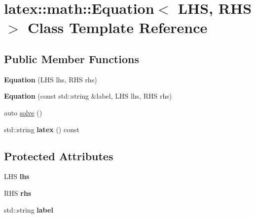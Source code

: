 \hypertarget{classlatex_1_1math_1_1Equation}{\section{latex\-:\-:math\-:\-:\-Equation$<$ \-L\-H\-S, \-R\-H\-S $>$ \-Class \-Template \-Reference}
\label{classlatex_1_1math_1_1Equation}
}
\subsection*{\-Public \-Member \-Functions}
\begin{DoxyCompactItemize}
\item 
\hypertarget{classlatex_1_1math_1_1Equation_abf2df112f6302c99b56fa31927142d33}{{\bfseries \-Equation} (\-L\-H\-S lhs, \-R\-H\-S rhs)}\label{classlatex_1_1math_1_1Equation_abf2df112f6302c99b56fa31927142d33}

\item 
\hypertarget{classlatex_1_1math_1_1Equation_a354a3d509dd259c1c0b51ab915867169}{{\bfseries \-Equation} (const std\-::string \&label, \-L\-H\-S lhs, \-R\-H\-S rhs)}\label{classlatex_1_1math_1_1Equation_a354a3d509dd259c1c0b51ab915867169}

\item 
auto \hyperlink{classlatex_1_1math_1_1Equation_a07edd6119b4c578f0bd109501284120b}{solve} ()
\item 
\hypertarget{classlatex_1_1math_1_1Equation_acc052b3d3d93f32438ada7338b641d6e}{std\-::string {\bfseries latex} () const }\label{classlatex_1_1math_1_1Equation_acc052b3d3d93f32438ada7338b641d6e}

\end{DoxyCompactItemize}
\subsection*{\-Protected \-Attributes}
\begin{DoxyCompactItemize}
\item 
\hypertarget{classlatex_1_1math_1_1Equation_a8e2395207a86cc6fda70df7e31ca004f}{\-L\-H\-S {\bfseries lhs}}\label{classlatex_1_1math_1_1Equation_a8e2395207a86cc6fda70df7e31ca004f}

\item 
\hypertarget{classlatex_1_1math_1_1Equation_aacaf6103dff8138d0e6836def99dea50}{\-R\-H\-S {\bfseries rhs}}\label{classlatex_1_1math_1_1Equation_aacaf6103dff8138d0e6836def99dea50}

\item 
\hypertarget{classlatex_1_1math_1_1Equation_af90f3dae754e6f4dbd5e44c0e45a14f5}{std\-::string {\bfseries label}}\label{classlatex_1_1math_1_1Equation_af90f3dae754e6f4dbd5e44c0e45a14f5}

\end{DoxyCompactItemize}
